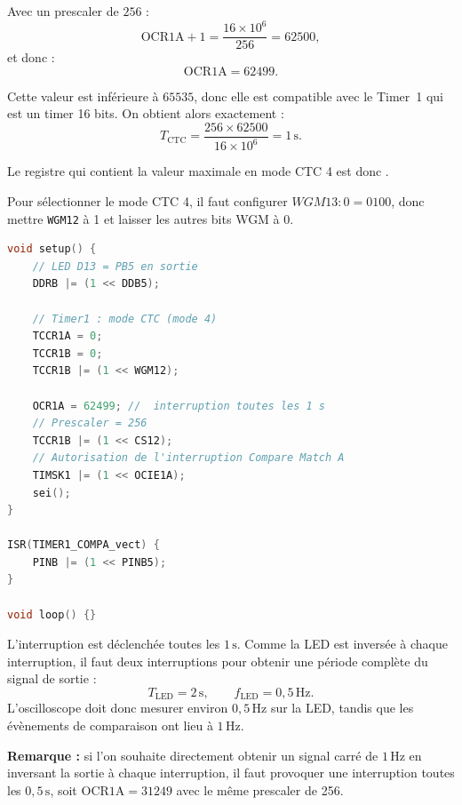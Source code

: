 \documentclass[a4paper,11pt]{article}
\begin{document}
\begin{itemize}
\begin{solution}
        Avec un prescaler de \(256\) :
        \[
            \mathrm{OCR1A}+1
            = \frac{16\times 10^6}{256}
            = 62500,
        \]
        et donc :
        \[
            \boxed{\mathrm{OCR1A}=62499}.
        \]

        Cette valeur est inférieure à \(65535\), donc elle est compatible avec
        le Timer~1 qui est un timer 16 bits. On obtient alors exactement :
        \[
            T_{\mathrm{CTC}}
            = \frac{256\times 62500}{16\times 10^6}
            = \boxed{1\,\mathrm{s}}.
        \]

        Le registre qui contient la valeur maximale en mode CTC 4 est donc
        .

        Pour sélectionner le mode CTC 4, il faut configurer
        \(WGM13:0=0100\), donc mettre \texttt{WGM12} à 1 et laisser les autres
        bits WGM à 0.
        
        \end{solution}
        
        \begin{solution}
        \begin{lstlisting}[language=C++]
void setup() {
    // LED D13 = PB5 en sortie
    DDRB |= (1 << DDB5);

    // Timer1 : mode CTC (mode 4)
    TCCR1A = 0;
    TCCR1B = 0;
    TCCR1B |= (1 << WGM12);

    OCR1A = 62499; //  interruption toutes les 1 s
    // Prescaler = 256
    TCCR1B |= (1 << CS12);
    // Autorisation de l'interruption Compare Match A
    TIMSK1 |= (1 << OCIE1A);
    sei();
}

ISR(TIMER1_COMPA_vect) {
    PINB |= (1 << PINB5);
}

void loop() {}
        \end{lstlisting}

        L'interruption est déclenchée toutes les \(1\,\mathrm{s}\).
        Comme la LED est inversée à chaque interruption, il faut deux
        interruptions pour obtenir une période complète du signal de sortie :
        \[
            T_{\mathrm{LED}}=2\,\mathrm{s},
            \qquad
            f_{\mathrm{LED}}=\boxed{0{,}5\,\mathrm{Hz}}.
        \]
        L'oscilloscope doit donc mesurer environ \(0{,}5\,\mathrm{Hz}\) sur la
        LED, tandis que les évènements de comparaison ont lieu à \(1\,\mathrm{Hz}\).

        \medskip
        \textbf{Remarque :} si l'on souhaite directement obtenir un signal carré
        de \(1\,\mathrm{Hz}\) en inversant la sortie à chaque interruption, il
        faut provoquer une interruption toutes les \(0{,}5\,\mathrm{s}\), soit
        \(\mathrm{OCR1A}=31249\) avec le même prescaler de 256.
    \end{solution}


\end{itemize}
\end{document}
